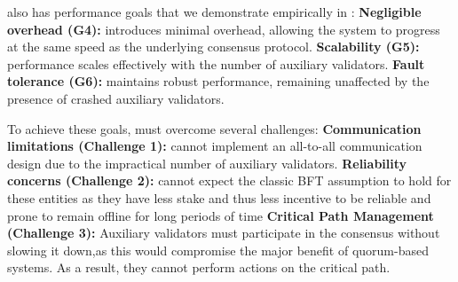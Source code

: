 \sysname also has performance goals that we demonstrate empirically in :
\textbf{Negligible overhead (G4):} \sysname introduces minimal overhead, allowing the system to progress at the same speed as the underlying consensus protocol.
\textbf{Scalability (G5):} \sysname performance scales effectively with the number of auxiliary validators.
\textbf{Fault tolerance (G6):} \sysname maintains robust performance, remaining unaffected by the presence of crashed auxiliary validators.

To achieve these goals, \sysname must overcome several challenges:
\textbf{Communication limitations (Challenge 1):} \sysname cannot implement an all-to-all communication design due to the impractical number of auxiliary validators.
\textbf{Reliability concerns (Challenge 2):} \sysname cannot expect the classic BFT assumption to hold for these entities as they have less stake and thus less incentive to be reliable and prone to remain offline for long periods of time
\textbf{Critical Path Management (Challenge 3):} Auxiliary validators must participate in the consensus without slowing it down,as this would compromise the major benefit of quorum-based systems.  As a result, they cannot perform actions on the critical path.
